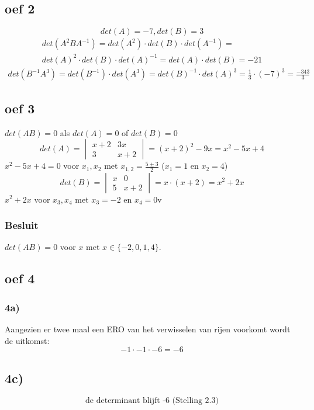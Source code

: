 \documentclass[10pt,a4paper]{article}
\begin{document}
\subsection*{oef 2}
\[det(A) = -7, det(B) = 3\]
\begin{gather*}
    det(A^2BA^{-1}) =
    det(A^2) \cdot det(B) \cdot det(A^{-1}) =\\
    det(A)^2 \cdot det(B) \cdot det(A)^{-1} = det(A) \cdot det(B) = -21
\end{gather*}
\begin{gather*}
    det(B^{-1}A^3) = det(B^{-1}) \cdot det(A^3) = det(B)^{-1} \cdot det(A)^3 = \frac{1}{3} \cdot (-7)^3 = \frac{-343}{3}
\end{gather*}

\subsection*{oef 3}
$det(AB) = 0$ als $det(A) = 0$ of $det(B) = 0$
\\
\[det(A) = \begin{vmatrix}
x + 2 & 3x\\
3 & x + 2
\end{vmatrix}
 = (x + 2)^2 - 9x = x^2 -5 x + 4
\]
$x^2 -5 x + 4 = 0$ voor $x_1, x_2$ met $x_{1,2} = \frac{5 \pm 3}{2}$ ($x_1 = 1$ en $x_2 = 4$)
\\
\[det(B) = \begin{vmatrix}
x & 0\\
5 & x + 2
\end{vmatrix}
 = x \cdot (x + 2) = x^2 + 2x\]
$x^2 + 2x$ voor $x_3, x_4$ met $x_3 = -2$ en $x_4 = 0$v 
\subsubsection*{Besluit}
$det(AB) = 0$ voor $x$ met $x \in \{-2, 0, 1, 4\}$.
\subsection*{oef 4}
\subsubsection*{4a)}
Aangezien er twee maal een ERO van het verwisselen van rijen voorkomt wordt de uitkomst:
$$-1\cdot -1\cdot -6 = -6$$
\subsection*{4c)}
\[ \text{de determinant blijft -6 (Stelling 2.3)} \]
\end{document}
